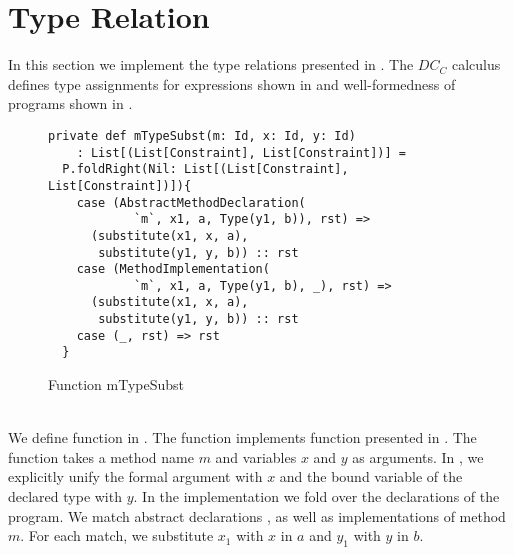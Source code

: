 \section{Type Relation}
In this section we implement the type relations presented in .
The $DC_C$ calculus defines type assignments for expressions
shown in 
and well-formedness of programs shown in .
%
\begin{figure}[h]
\begin{lstlisting}
private def mTypeSubst(m: Id, x: Id, y: Id)
    : List[(List[Constraint], List[Constraint])] =
  P.foldRight(Nil: List[(List[Constraint], List[Constraint])]){
    case (AbstractMethodDeclaration(
            `m`, x1, a, Type(y1, b)), rst) =>
      (substitute(x1, x, a),
       substitute(y1, y, b)) :: rst
    case (MethodImplementation(
            `m`, x1, a, Type(y1, b), _), rst) =>
      (substitute(x1, x, a),
       substitute(y1, y, b)) :: rst
    case (_, rst) => rst
  }
\end{lstlisting}
\caption{Function mTypeSubst}
\label{fig:scala-mtype}
\end{figure}\\
We define function  in .
The function implements function 
presented in .
The function takes a method name $m$ and
variables $x$ and $y$ as arguments.
In , we explicitly unify the formal argument
with $x$ and the bound variable of the declared type with $y$.
In the implementation we fold over the declarations of the program.
We match abstract declarations ,
as well as implementations  of method $m$.
For each match, we substitute $x_1$ with $x$ in $a$ and $y_1$ with $y$ in $b$.


